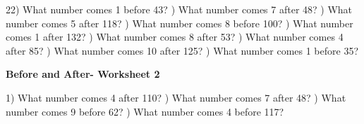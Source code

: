 \documentclass{article}%
\begin{document}
22) What number comes 1 before 43?%
\newline%
\newline%
) What number comes 7 after 48?%
\newline%
\newline%
) What number comes 5 after 118?%
\newline%
\newline%
) What number comes 8 before 100?%
\newline%
\newline%
) What number comes 1 after 132?%
\newline%
\newline%
) What number comes 8 after 53?%
\newline%
\newline%
) What number comes 4 after 85?%
\newline%
\newline%
) What number comes 10 after 125?%
\newline%
\newline%
) What number comes 1 before 35?%
\newline%
\newline%
\newline%
\pagebreak%
\large%
\begin{center}%
\textbf{Before and After- Worksheet 2}%
\newline%
\end{center} \normalsize%
1) What number comes 4 after 110?%
\newline%
\newline%
) What number comes 7 after 48?%
\newline%
\newline%
) What number comes 9 before 62?%
\newline%
\newline%
) What number comes 4 before 117?%
\newline%
\newline%
\newline%
\end{document}
